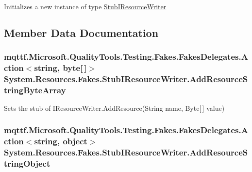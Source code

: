 Initializes a new instance of type \hyperlink{class_system_1_1_resources_1_1_fakes_1_1_stub_i_resource_writer}{Stub\-I\-Resource\-Writer}



\subsection{Member Data Documentation}
\hypertarget{class_system_1_1_resources_1_1_fakes_1_1_stub_i_resource_writer_aa6a2c2949fe0e75f4265322607e1ee3f}{
\subsubsection[{Add\-Resource\-String\-Byte\-Array}]{\setlength{\rightskip}{0pt plus 5cm}mqttf.\-Microsoft.\-Quality\-Tools.\-Testing.\-Fakes.\-Fakes\-Delegates.\-Action$<$string, byte\mbox{[}$\,$\mbox{]}$>$ System.\-Resources.\-Fakes.\-Stub\-I\-Resource\-Writer.\-Add\-Resource\-String\-Byte\-Array}}\label{class_system_1_1_resources_1_1_fakes_1_1_stub_i_resource_writer_aa6a2c2949fe0e75f4265322607e1ee3f}


Sets the stub of I\-Resource\-Writer.\-Add\-Resource(\-String name, Byte\mbox{[}$\,$\mbox{]} value)

\hypertarget{class_system_1_1_resources_1_1_fakes_1_1_stub_i_resource_writer_a12f5f47f114cae6269c4c74de63d291d}{
\subsubsection[{Add\-Resource\-String\-Object}]{\setlength{\rightskip}{0pt plus 5cm}mqttf.\-Microsoft.\-Quality\-Tools.\-Testing.\-Fakes.\-Fakes\-Delegates.\-Action$<$string, object$>$ System.\-Resources.\-Fakes.\-Stub\-I\-Resource\-Writer.\-Add\-Resource\-String\-Object}}\label{class_system_1_1_resources_1_1_fakes_1_1_stub_i_resource_writer_a12f5f47f114cae6269c4c74de63d291d}


